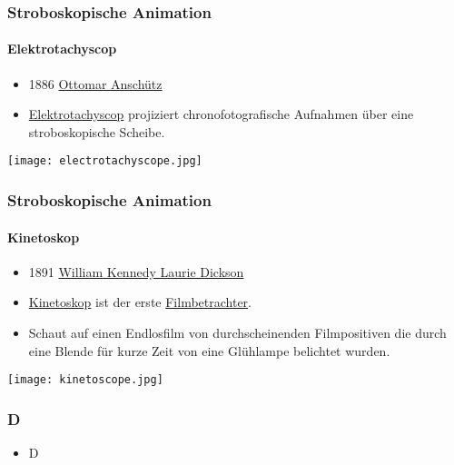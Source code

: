 \begin{frame}
    \frametitle{Stroboskopische Animation}
    \framesubtitle{Elektrotachyscop}
    \begin{minipage}{0.5\textwidth}
        \begin{itemize}
            \item 1886 \href{https://de.wikipedia.org/wiki/Ottomar_Ansch\%C3\%BCtz}{Ottomar Anschütz}
            \item \href{https://de.wikipedia.org/wiki/Elektrotachyscop}{Elektrotachyscop} projiziert chronofotografische Aufnahmen über eine stroboskopische Scheibe.
        \end{itemize}
    \end{minipage} \hfill
    \begin{minipage}{0.45\textwidth}
        \texttt{[image: electrotachyscope.jpg]}
    \end{minipage}
\end{frame}

\begin{frame}
    \frametitle{Stroboskopische Animation}
    \framesubtitle{Kinetoskop}
    \begin{minipage}{0.5\textwidth}
        \begin{itemize}
            \item 1891 \href{https://de.wikipedia.org/wiki/William_Kennedy_Laurie_Dickson}{William Kennedy Laurie Dickson}
            \item \href{https://de.wikipedia.org/wiki/Kinetoskop}{Kinetoskop} ist der erste \href{https://de.wikipedia.org/wiki/Filmbetrachter}{Filmbetrachter}.
            \item Schaut auf einen Endlosfilm von durchscheinenden Filmpositiven die durch eine Blende für kurze Zeit von eine Glühlampe belichtet wurden.
        \end{itemize}
    \end{minipage} \hfill
    \begin{minipage}{0.45\textwidth}
        \texttt{[image: kinetoscope.jpg]}
    \end{minipage}
\end{frame}


\begin{frame}
    \frametitle{D}
    \begin{itemize}
        \item D
    \end{itemize}

\end{frame}
